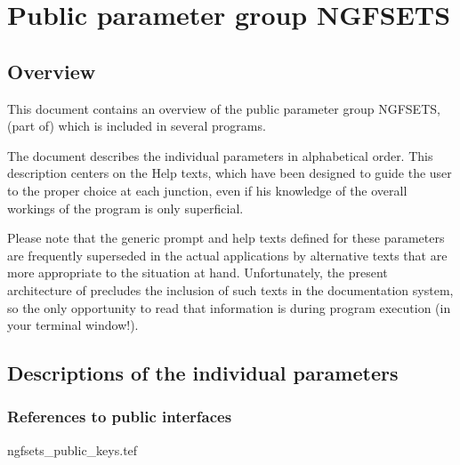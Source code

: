 
\chapter{ Public parameter group NGFSETS}
\tableofcontents


\section{ Overview}

	This document contains an overview of the public parameter group
NGFSETS, (part of) which is included in several \NEWSTAR programs.



	The
document describes the individual parameters in alphabetical order. This
description centers on the Help texts, which have been designed to guide the
user to the proper choice at each junction, even if his knowledge of the
overall workings of the program is only superficial.

	Please note that the generic prompt and help texts defined for these
parameters are frequently superseded in the actual applications by alternative
texts that are more appropriate to the situation at hand. Unfortunately, the
present architecture of \NEWSTAR precludes the inclusion of such texts in the
documentation system, so the only opportunity to read that information is
during program execution (in your terminal window!).


\section{ Descriptions of the individual parameters}
\label{.descriptions}

\subsection{ References to public interfaces}
\label{.public}

 {ngfsets_public_keys.tef}
